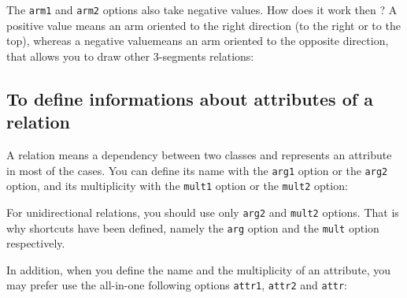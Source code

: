 \documentclass[a4paper,11pt]{report}
\begin{document}
\medskip

The {\tt arm1} and {\tt arm2} options also take negative values. How does it work then ?
A positive value means an arm oriented to the right direction (to the right or to the top), whereas a negative valuemeans an arm oriented to the opposite direction, that allows you to draw other 3-segments relations:

\medskip

\begin{minipage}{0.5\textwidth}
	
\end{minipage}
\begin{minipage}{0.4\textwidth}
	\begin{center}
	\end{center}
\end{minipage}


\subsection{To define informations about attributes of a relation}\label{ss.relattr}

A relation means a dependency between two classes and represents an attribute in most of the cases. You can define its name with the {\tt arg1} option or the {\tt arg2} option, and its multiplicity with the {\tt mult1} option or the {\tt mult2} option:

\medskip

\begin{minipage}{0.5\textwidth}
	
\end{minipage}
\begin{minipage}{0.4\textwidth}
	\begin{center}
	\end{center}
\end{minipage}

\medskip

For unidirectional relations, you should use only {\tt arg2} and {\tt mult2} options. That is why shortcuts have been defined, namely the {\tt arg} option and the {\tt mult} option respectively.

In addition, when you define the name and the multiplicity of an attribute, you may prefer use the all-in-one following options {\tt attr1}, {\tt attr2} and {\tt attr}:

\medskip

\begin{minipage}{0.5\textwidth}
	
\end{minipage}
\begin{minipage}{0.4\textwidth}
	\begin{center}
	\end{center}
\end{minipage}
\end{document}
